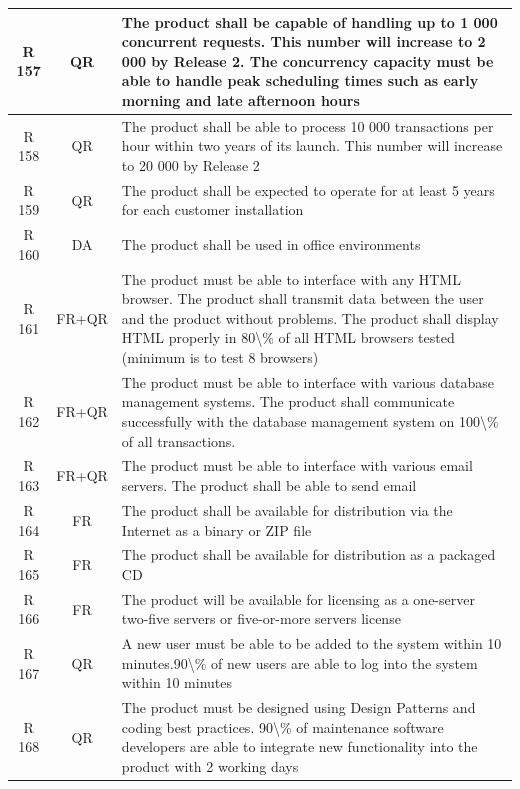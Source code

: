 \documentclass[dissertation,final]{softeng}
\begin{document}
\begin{appendices}
{\begin{center}
\begin{longtable}{c c m{}}
    R 157   & QR & The product shall be capable of handling up to 1 000 concurrent requests. This number will increase to 2 000 by Release 2. The concurrency capacity must be able to handle peak scheduling times such as early morning and late afternoon hours \\    \midrule
    R 158   & QR & The product shall be able to process 10 000 transactions per hour within two years of its launch. This number will increase to 20 000 by Release 2 \\    \midrule
    R 159   & QR & The product shall be expected to operate for at least 5 years for each customer installation \\    \midrule
    R 160   & DA & The product shall be used in office environments \\    \midrule
    R 161   & FR+QR & The product must be able to interface with any HTML browser. The product shall transmit data between the user and the product without problems. The product shall display HTML properly in 80\textbackslash{}\% of all HTML browsers tested (minimum is to test 8 browsers) \\    \midrule
    R 162   & FR+QR & The product must be able to interface with various database management systems. The product shall communicate successfully with the database management system on 100\textbackslash{}\% of all transactions. \\    \midrule
    R 163   & FR+QR & The product must be able to interface with various email servers. The product shall be able to send email \\    \midrule
    R 164   & FR & The product shall be available for distribution via the Internet as a binary or ZIP file \\    \midrule
    R 165   & FR & The product shall be available for distribution as a packaged CD \\    \midrule
    R 166   & FR & The product will be available for licensing as a one-server two-five servers or five-or-more servers license \\    \midrule
    R 167   & QR & A new user must be able to be added to the system within 10 minutes.90\textbackslash{}\% of new users are able to log into the system within 10 minutes \\    \midrule
    R 168   & QR & The product must be designed using Design Patterns and coding best practices. 90\textbackslash{}\% of maintenance software developers are able to integrate new functionality into the product with 2 working days \\    \midrule

\end{longtable}
\end{center}}
\end{appendices}
\end{document}
